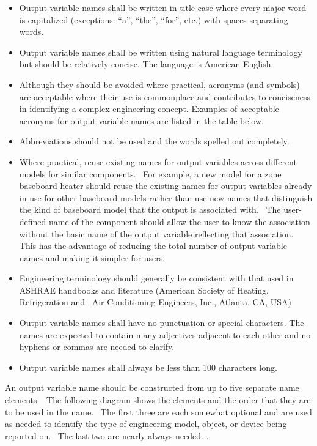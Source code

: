 \begin{itemize}
\item
  Output variable names shall be written in title case where every major word is capitalized (exceptions: ``a'', ``the'', ``for'', etc.) with spaces separating words.
\item
  Output variable names shall be written using natural language terminology but should be relatively concise. The language is American English.
\item
  Although they should be avoided where practical, acronyms (and symbols) are acceptable where their use is commonplace and contributes to conciseness in identifying a complex engineering concept. Examples of acceptable acronyms for output variable names are listed in the table below.
\item
  Abbreviations should not be used and the words spelled out completely.
\item
  Where practical, reuse existing names for output variables across different models for similar components.~ For example, a new model for a zone baseboard heater should reuse the existing names for output variables already in use for other baseboard models rather than use new names that distinguish the kind of baseboard model that the output is associated with.~ The user-defined name of the component should allow the user to know the association without the basic name of the output variable reflecting that association.~ This has the advantage of reducing the total number of output variable names and making it simpler for users.
\item
  Engineering terminology should generally be consistent with that used in ASHRAE handbooks and literature (American Society of Heating, Refrigeration and~ Air-Conditioning Engineers, Inc., Atlanta, CA, USA)
\item
  Output variable names shall have no punctuation or special characters. The names are expected to contain many adjectives adjacent to each other and no hyphens or commas are needed to clarify.
\item
  Output variable names shall always be less than 100 characters long.
\end{itemize}

An output variable name should be constructed from up to five separate name elements.~ The following diagram shows the elements and the order that they are to be used in the name.~ The first three are each somewhat optional and are used as needed to identify the type of engineering model, object, or device being reported on.~ The last two are nearly always needed. .

